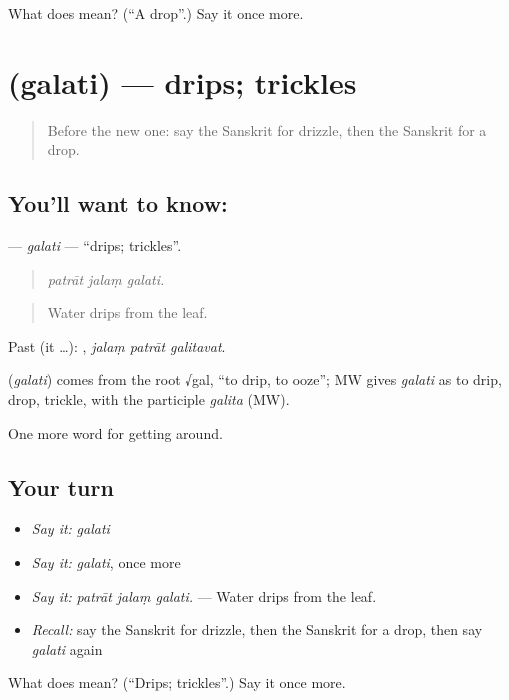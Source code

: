 \begin{tcolorbox}[breakable,colback=teal!4,colframe=teal!35!black,title={Before you move on}]
What does  mean? (\textquotedblleft{}A drop\textquotedblright{}.) Say it once more.
\end{tcolorbox}
\section[\texorpdfstring{\sk{गलति} (galati)}{गलति (galati)}]{ (galati) — drips; trickles}

\label{lesson:SA-C437-galati}



\begin{quote}
Before the new one: say the Sanskrit for drizzle, then the Sanskrit for a drop.
\end{quote}

\subsection*{You'll want to know: }
\textbf{} — \emph{galati} — \textquotedblleft{}drips; trickles\textquotedblright{}.

\begin{quote}
  
\end{quote}

\begin{quote}
\emph{patrāt jalaṃ galati.}
\end{quote}

\begin{quote}
Water drips from the leaf.
\end{quote}

Past (it …):   , \emph{jalaṃ patrāt galitavat}.

\begin{cousinweb}
\textbf{} (\emph{galati}) comes from the root √gal, \textquotedblleft{}to drip, to ooze\textquotedblright{}; MW gives \emph{galati} as to drip, drop, trickle, with the participle \emph{galita} (MW).
\end{cousinweb}

\begin{grammarlens}[title={What you've built}]
One more word for getting around.
\end{grammarlens}

\subsection*{Your turn}
\begin{itemize}
\raggedright
  \item \emph{Say it:} \emph{galati}
  \item \emph{Say it:} \emph{galati}, once more
  \item \emph{Say it:} \emph{patrāt jalaṃ galati.} — Water drips from the leaf.
  \item \emph{Recall:} say the Sanskrit for drizzle, then the Sanskrit for a drop, then say \emph{galati} again
\end{itemize}

\begin{tcolorbox}[breakable,colback=teal!4,colframe=teal!35!black,title={Before you move on}]
What does  mean? (\textquotedblleft{}Drips; trickles\textquotedblright{}.) Say it once more.
\end{tcolorbox}

